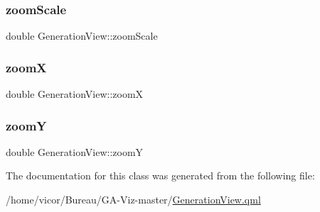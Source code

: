 \mbox{\label{class_generation_view_ad57ffa675b53681b9671f7a61286d426}} 
\subsubsection{\texorpdfstring{zoom\+Scale}{zoomScale}}
{\footnotesize\ttfamily double Generation\+View\+::zoom\+Scale}

\mbox{\label{class_generation_view_a3d67ca1114e1b862aed9cf857bb7aa10}} 
\subsubsection{\texorpdfstring{zoomX}{zoomX}}
{\footnotesize\ttfamily double Generation\+View\+::zoomX}

\mbox{\label{class_generation_view_aadd82b9a0aa525d054082aaa4c04c4a9}} 
\subsubsection{\texorpdfstring{zoomY}{zoomY}}
{\footnotesize\ttfamily double Generation\+View\+::zoomY}



The documentation for this class was generated from the following file\+:\begin{DoxyCompactItemize}
\item 
/home/vicor/\+Bureau/\+G\+A-\/\+Viz-\/master/\hyperlink{_generation_view_8qml}{Generation\+View.\+qml}\end{DoxyCompactItemize}
